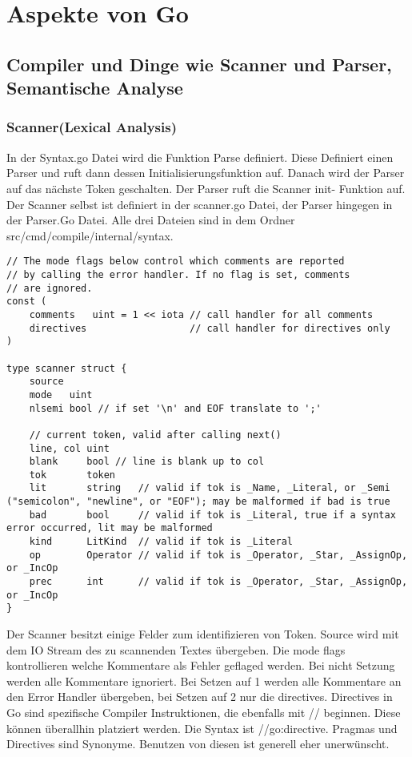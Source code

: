\chapter{Aspekte von Go}\label{ch:method}

\section{Compiler und Dinge wie Scanner und Parser, Semantische Analyse}
\subsection{Scanner(Lexical Analysis)}
In der Syntax.go Datei wird die Funktion Parse definiert. Diese Definiert einen Parser und ruft dann dessen Initialisierungsfunktion auf. Danach wird der Parser auf das nächste Token geschalten. 
Der Parser ruft die Scanner init- Funktion auf. Der Scanner selbst ist definiert in der scanner.go Datei, der Parser hingegen in der Parser.Go Datei. Alle drei Dateien sind in dem Ordner src/cmd/compile/internal/syntax. 
\cite{donovan_go_2016}
\begin{lstlisting}
// The mode flags below control which comments are reported
// by calling the error handler. If no flag is set, comments
// are ignored.
const (
	comments   uint = 1 << iota // call handler for all comments
	directives                  // call handler for directives only
)

type scanner struct {
	source
	mode   uint
	nlsemi bool // if set '\n' and EOF translate to ';'

	// current token, valid after calling next()
	line, col uint
	blank     bool // line is blank up to col
	tok       token
	lit       string   // valid if tok is _Name, _Literal, or _Semi ("semicolon", "newline", or "EOF"); may be malformed if bad is true
	bad       bool     // valid if tok is _Literal, true if a syntax error occurred, lit may be malformed
	kind      LitKind  // valid if tok is _Literal
	op        Operator // valid if tok is _Operator, _Star, _AssignOp, or _IncOp
	prec      int      // valid if tok is _Operator, _Star, _AssignOp, or _IncOp
}
\end{lstlisting}
Der Scanner besitzt einige Felder zum identifizieren von Token. 
Source wird mit dem IO Stream des zu scannenden Textes übergeben.
Die mode flags kontrollieren welche Kommentare als Fehler geflaged werden. 
Bei nicht Setzung werden alle Kommentare ignoriert. Bei Setzen auf 1 werden alle Kommentare an den Error Handler übergeben, bei Setzen auf 2 nur die directives. Directives in Go sind spezifische Compiler Instruktionen, die ebenfalls mit // beginnen. Diese können überallhin platziert werden. Die Syntax ist //go:directive. Pragmas und Directives sind Synonyme. Benutzen von diesen ist generell eher unerwünscht.
